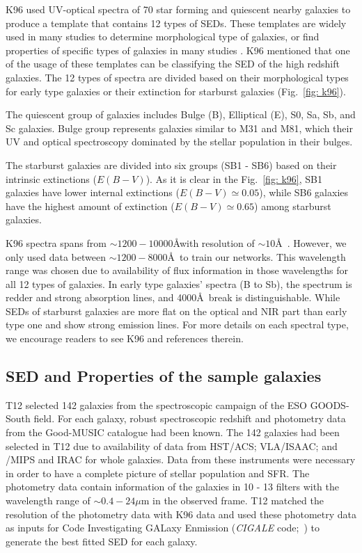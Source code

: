     K96 used UV-optical spectra of 70 star forming and quiescent nearby galaxies to produce a template that contains 12 types of SEDs.
    These templates are widely used in many studies to determine morphological type of galaxies, or find properties of specific types of galaxies in many studies \citep[e.g.][]{Shakouri16,Paiano16,Laporte16,Holden16}.
    K96 mentioned that one of the usage of these templates can be classifying the SED of the high redshift galaxies. 
    The 12 types of spectra are divided based on their morphological types for early type galaxies or their extinction for starburst galaxies (Fig.~\ref{fig: k96}). 

    The quiescent group of galaxies includes Bulge (B), Elliptical (E), S0, Sa, Sb, and Sc galaxies.
    Bulge group represents galaxies similar to M31 and M81, which their UV and optical spectroscopy dominated by the stellar population in their bulges.
    
    The starburst galaxies are divided into six groups (SB1 - SB6) based on their intrinsic extinctions ($E(B-V)$). 
    As it is clear in the Fig.~\ref{fig: k96}, SB1 galaxies have lower internal extinctions ($E(B-V) \simeq 0.05$), while SB6 galaxies have the highest amount of extinction ($E(B-V) \simeq 0.65$) among starburst galaxies. 
    
    K96 spectra spans from $\sim1200-10000$\AA with resolution of $\sim 10$\AA~.
    However, we only used data between $\sim1200-8000$\AA~to train our networks. 
    This wavelength range was chosen due to availability of flux information in those wavelengths for all 12 types of galaxies.
    In early type galaxies' spectra (B to Sb), the spectrum is redder and strong absorption lines, and 4000\AA~break is distinguishable. 
    While SEDs of starburst galaxies are more flat on the optical and NIR part than early type one and show strong emission lines.
    For more details on each spectral type, we encourage readers to see K96 and references therein. 
    

 \subsection{SED and Properties of the sample galaxies} 
    T12 selected 142 galaxies from the spectroscopic campaign of the ESO GOODS-South field.
    For each galaxy, robust spectroscopic redshift and photometry data from the Good-MUSIC catalogue had been known.
    The 142 galaxies had been selected in T12 due to availability of data from HST/ACS; VLA/ISAAC; and \Spitzer/MIPS and IRAC for whole galaxies. 
    Data from these instruments were necessary in order to have a complete picture of stellar population and SFR.
    The photometry data contain information of the galaxies in 10 - 13 filters with the wavelength range of $\sim 0.4-24 \mu$m in the observed frame.
    T12 matched the resolution of the photometry data with K96 data and used these photometry data as inputs for Code Investigating GALaxy Enmission ({\em CIGALE} code;~\citep[][hereafter N09]{Noll09}) to generate the best fitted SED for each galaxy.%
    
